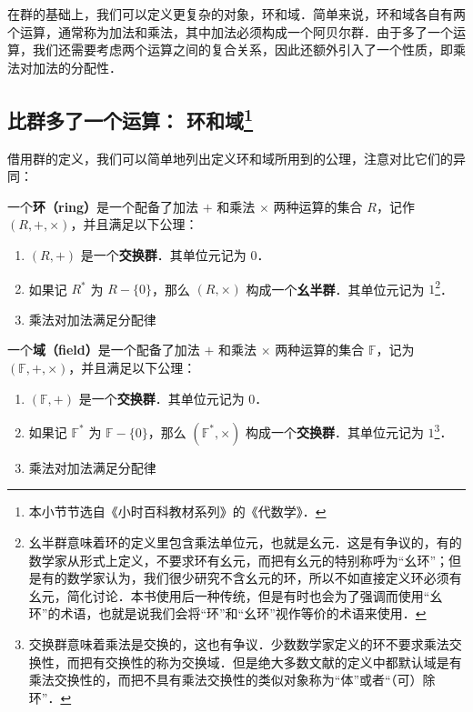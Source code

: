 

在群的基础上，我们可以定义更复杂的对象，环和域．简单来说，环和域各自有两个运算，通常称为加法和乘法，其中加法必须构成一个阿贝尔群．由于多了一个运算，我们还需要考虑两个运算之间的复合关系，因此还额外引入了一个性质，即乘法对加法的分配性．

\subsection{比群多了一个运算： 环和域\footnote{本小节节选自《小时百科教材系列》的《代数学》．}}

借用群的定义，我们可以简单地列出定义环和域所用到的公理，注意对比它们的异同：

\begin{definition}{}
一个\textbf{环（ring）}是一个配备了加法 $+$ 和乘法 $\times$ 两种运算的集合 $R$，记作 $(R, +, \times)$，并且满足以下公理：
\begin{enumerate}
    \item $(R, +)$ 是一个\textbf{交换群}．其单位元记为 $0$．
    \item 如果记 $R^*$ 为 $R-\{0\}$，那么 $(R, \times)$ 构成一个\textbf{幺半群}．其单位元记为 $1$\footnote{幺半群意味着环的定义里包含乘法单位元，也就是幺元．这是有争议的，有的数学家从形式上定义，不要求环有幺元，而把有幺元的特别称呼为“幺环”；但是有的数学家认为，我们很少研究不含幺元的环，所以不如直接定义环必须有幺元，简化讨论．本书使用后一种传统，但是有时也会为了强调而使用“幺环”的术语，也就是说我们会将“环”和“幺环”视作等价的术语来使用．}．
    \item 乘法对加法满足分配律
\end{enumerate}
\end{definition}

\begin{definition}{}
一个\textbf{域（field）}是一个配备了加法 $+$ 和乘法 $\times$ 两种运算的集合 $\mathbb{F}$，记为 $(\mathbb{F}, +, \times)$，并且满足以下公理：

\begin{enumerate}
    \item $(\mathbb{F}, +)$ 是一个\textbf{交换群}．其单位元记为 $0$．
    \item 如果记 $\mathbb{F}^*$ 为 $\mathbb{F}-\{0\}$，那么 $(\mathbb{F}^*, \times)$ 构成一个\textbf{交换群}．其单位元记为 $1$\footnote{交换群意味着乘法是交换的，这也有争议．少数数学家定义的环不要求乘法交换性，而把有交换性的称为交换域．但是绝大多数文献的定义中都默认域是有乘法交换性的，而把不具有乘法交换性的类似对象称为“体”或者“（可）除环”．}．
    \item 乘法对加法满足分配律
\end{enumerate}
\end{definition}


